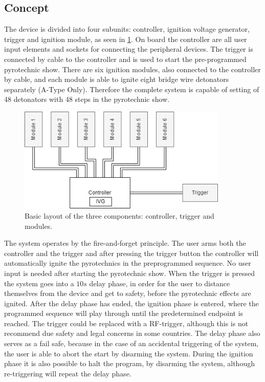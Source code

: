\pagebreak
\subsection{Concept}
\label{Concept}
The device is divided into four subunits: controller, ignition voltage generator, trigger and ignition module, as seen in \cref{fig:concept}. On board the controller are all user input elements and sockets for connecting the peripheral devices. The trigger is connected by cable to the controller and is used to start the pre-programmed pyrotechnic show. There are six ignition modules, also connected to the controller by cable, and each module is able to ignite eight bridge wire detonators separately (A-Type Only).  Therefore the complete system is capable of setting of 48 detonators with 48 steps in the pyrotechnic show. 


\begin{figure}[!ht]
    \centering
    \includegraphics[width=10cm]{./Figures/concept_all.png}
    \caption{Basic layout of the three components: controller, trigger and modules.}
    \label{fig:concept}     
\end{figure}

\noindent The system operates by the fire-and-forget principle. The user arms both the controller and the trigger and after pressing the trigger button the controller will automatically ignite the pyrotechnics in the preprogrammed sequence. No user input is needed after starting the pyrotechnic show. When the trigger is pressed the system goes into a $10s$ delay phase, in order for the user to distance themselves from the device and get to safety, before the pyrotechnic effects are ignited. After the delay phase has ended, the ignition phase is entered, where the programmed sequence will play through until the predetermined endpoint is reached. The trigger could be replaced with a RF-trigger, although this is not recommend due safety and legal concerns in some countries. The delay phase also serves as a fail safe, because in the case of an accidental triggering of the system, the user is able to abort the start by disarming the system. During the ignition phase it is also possible to halt the program, by disarming the system, although re-triggering will repeat the delay phase.\\



